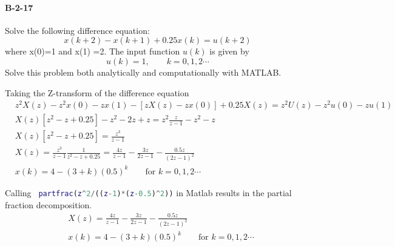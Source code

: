 {\paragraph{B-2-17} 
Solve the following difference equation:
\[x(k+2)-x(k+1)+0.25 x(k)= u(k+2) \]
where x(0)=1 and x(1) =2. The input function $u(k)$ is given by
\[u(k)=1, \qquad k=0,1,2 \cdots \]
Solve this problem both analytically and computationally with MATLAB.

Taking the Z-transform of the difference equation
\begin{align*}
& z^2X(z)-z^2x(0)-zx(1)-[zX(z)-zx(0)]+0.25X(z)= z^2U(z)-z^2u(0)-zu(1) \\
& X(z)[z^2-z+0.25]-z^2-2z+z=z^2 \frac{z}{z-1}-z^2-z \\
& X(z)[z^2-z+0.25]=\frac{z^3}{z-1} \\
& X(z)=\frac{z^3}{z-1}\frac{1}{z^2-z+0.25}=\frac{4z}{z-1}-\frac{3z}{2z-1}-\frac{0.5z}{(2z-1)^2} \\
& x(k) = 4-(3+k)(0.5)^k \qquad \text{for } k = 0,1,2 \cdots
\end{align*}

Calling  \lstinline[columns=fixed,language=Matlab]{ partfrac(z^2/((z-1)*(z-0.5)^2))} in Matlab results in the partial fraction decomposition.
\begin{align*}
& X(z) =\frac{4z}{z-1}-\frac{3z}{2z-1}-\frac{0.5z}{(2z-1)^2} \\ 
& x(k) = 4-(3+k)(0.5)^k \qquad \text{for } k = 0,1,2 \cdots
\end{align*}

}
